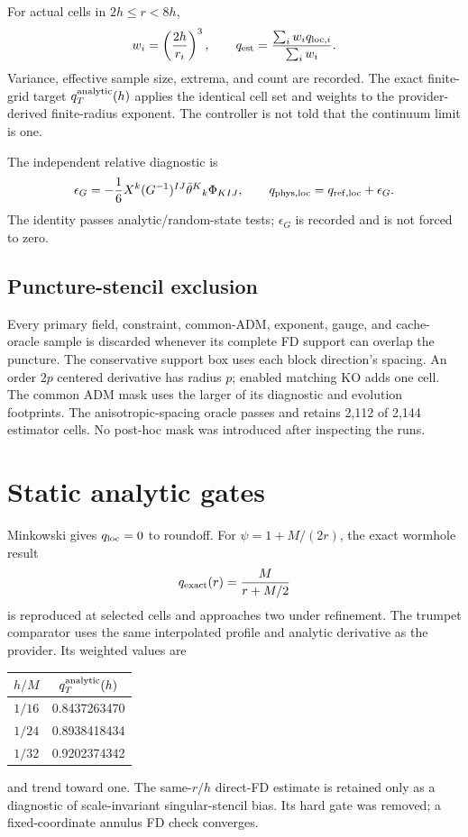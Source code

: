 \documentclass[10pt]{article}
\begin{document}
For actual cells in $2h\leq r<8h$,
\begin{equation}
w_i=\left(\frac{2h}{r_i}\right)^3,\qquad
q_{\rm est}=\frac{\sum_iw_iq_{{\rm loc},i}}{\sum_iw_i}.
\end{equation}
Variance, effective sample size, extrema, and count are recorded.  The exact
finite-grid target $q_T^{\rm analytic}(h)$ applies the identical cell set and
weights to the provider-derived finite-radius exponent.  The controller is not
told that the continuum limit is one.

The independent relative diagnostic is
\begin{equation}
\epsilon_G=-\frac16X^k(G^{-1})^{IJ}\bar\theta^K{}_k\Phi_{KIJ},
\qquad q_{\rm phys,loc}=q_{\rm ref,loc}+\epsilon_G.
\end{equation}
The identity passes analytic/random-state tests; $\epsilon_G$ is recorded and
is not forced to zero.

\subsection{Puncture-stencil exclusion}

Every primary field, constraint, common-ADM, exponent, gauge, and cache-oracle
sample is discarded whenever its complete FD support can overlap the puncture.
The conservative support box uses each block direction's spacing.  An order
$2p$ centered derivative has radius $p$; enabled matching KO adds one cell.
The common ADM mask uses the larger of its diagnostic and evolution footprints.
The anisotropic-spacing oracle passes and retains 2,112 of 2,144 estimator
cells.  No post-hoc mask was introduced after inspecting the runs.

\section{Static analytic gates}

Minkowski gives $q_{\rm loc}=0$ to roundoff.  For
$\psi=1+M/(2r)$, the exact wormhole result
\begin{equation}
q_{\rm exact}(r)=\frac{M}{r+M/2}
\end{equation}
is reproduced at selected cells and approaches two under refinement.  The
trumpet comparator uses the same interpolated profile and analytic derivative
as the provider.  Its weighted values are
\begin{center}
\begin{tabular}{c@{\qquad}c}
\toprule
$h/M$ & $q_T^{\rm analytic}(h)$\\
\midrule
$1/16$ & 0.8437263470\\
$1/24$ & 0.8938418434\\
$1/32$ & 0.9202374342\\
\bottomrule
\end{tabular}
\end{center}
and trend toward one.  The same-$r/h$ direct-FD estimate is retained only as a
diagnostic of scale-invariant singular-stencil bias.  Its hard gate was
removed; a fixed-coordinate annulus FD check converges.
\end{document}
